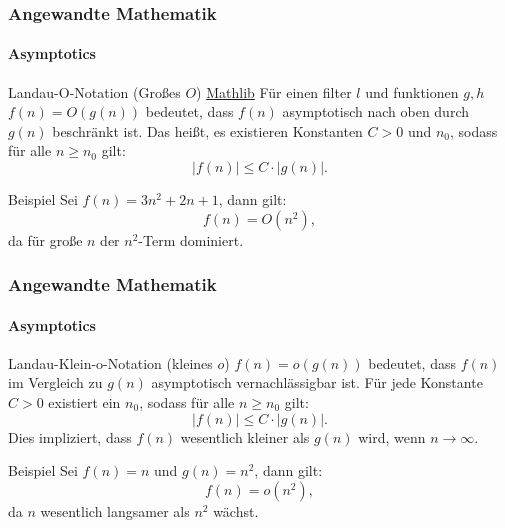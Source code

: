 \documentclass{beamer}
\begin{document}
\begin{frame}
    \frametitle{Angewandte Mathematik}
    \framesubtitle{Asymptotics}
    \begin{block}{Landau-O-Notation (Großes \( O \)) \href{https://github.com/leanprover-community/mathlib4/blob/418a5eb7aec3fb639097cb13f74fc031ac4057f2/Mathlib/Analysis/Asymptotics/Asymptotics.lean\#L75-L80}{Mathlib}
        }
        Für einen filter $l$ und funktionen $g,h$
    \( f(n) = O(g(n)) \) bedeutet, dass \( f(n) \) asymptotisch nach oben durch \( g(n) \) beschränkt ist. Das heißt, es existieren Konstanten \( C > 0 \) und \( n_0 \), sodass für alle \( n \geq n_0 \) gilt:
    \[
    |f(n)| \leq C \cdot |g(n)|.
    \]
    \end{block}

    \begin{exampleblock}{Beispiel} 
    Sei \( f(n) = 3n^2 + 2n + 1 \), dann gilt:
    \[
    f(n) = O(n^2),
    \]
    da für große \( n \) der \( n^2 \)-Term dominiert.
    \end{exampleblock}
\end{frame}

\begin{frame}
    \frametitle{Angewandte Mathematik}
    \framesubtitle{Asymptotics}
    
    \begin{block}{Landau-Klein-o-Notation (kleines \( o \))}
        \( f(n) = o(g(n)) \) bedeutet, dass \( f(n) \) im Vergleich zu \( g(n) \) asymptotisch vernachlässigbar ist. Für jede Konstante \( C > 0 \) existiert ein \( n_0 \), sodass für alle \( n \geq n_0 \) gilt:
        \[
        |f(n)| \leq C \cdot |g(n)|.
        \]
        Dies impliziert, dass \( f(n) \) wesentlich kleiner als \( g(n) \) wird, wenn \( n \to \infty \).
    \end{block}

    \begin{exampleblock}{Beispiel}
        Sei \( f(n) = n \) und \( g(n) = n^2 \), dann gilt:
        \[
        f(n) = o(n^2),
        \]
        da \( n \) wesentlich langsamer als \( n^2 \) wächst.
    \end{exampleblock}
\end{frame}
\end{document}
